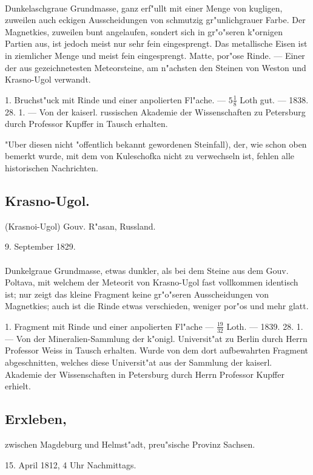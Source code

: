 \documentclass[a4paper, 11pt, oneside, polutonikogreek, german]{article}
\begin{document}
\paragraph{}
Dunkelaschgraue Grundmasse, ganz erf"ullt mit einer Menge von kugligen, zuweilen auch eckigen Ausscheidungen von schmutzig gr"unlichgrauer Farbe. Der Magnetkies, zuweilen bunt angelaufen, sondert sich in gr"o"seren k"ornigen Partien aus, ist jedoch meist nur sehr fein eingesprengt. Das metallische Eisen ist in ziemlicher Menge und meist fein eingesprengt. Matte, por"ose Rinde. --- Einer der aus gezeichnetesten Meteorsteine‚ am n"achsten den Steinen von Weston und Krasno-Ugol verwandt.

1. Bruchst"uck mit Rinde und einer anpolierten Fl"ache. --- $5\frac{1}{8}$ Loth gut. --- 1838. 28. 1. --- Von der kaiserl. russischen Akademie der Wissenschaften zu Petersburg durch Professor Kupffer in Tausch erhalten.

"Uber diesen nicht "offentlich bekannt gewordenen Steinfall), der, wie schon oben bemerkt wurde, mit dem von Kuleschofka nicht zu verwechseln ist, fehlen alle historischen Nachrichten.
\subsection{Krasno-Ugol.}
\begin{center}
\small
(Krasnoi-Ugol) Gouv. R"asan, Russland.

9. September 1829.
\end{center}
\paragraph{}
Dunkelgraue Grundmasse, etwas dunkler, als bei dem Steine aus dem Gouv. Poltava, mit welchem der Meteorit von Krasno-Ugol fast vollkommen identisch ist; nur zeigt das kleine Fragment keine gr"o"seren Ausscheidungen von Magnetkies; auch ist die Rinde etwas verschieden, weniger por"os und mehr glatt.

1. Fragment mit Rinde und einer anpolierten Fl"ache --- $\frac{19}{32}$ Loth. --- 1839. 28. 1. --- Von der Mineralien-Sammlung der k"onigl. Universit"at zu Berlin durch Herrn Professor Weiss in Tausch erhalten. Wurde von dem dort aufbewahrten Fragment abgeschnitten, welches diese Universit"at aus der Sammlung der kaiserl. Akademie der Wissenschaften in Petersburg durch Herrn Professor Kupffer erhielt.
\subsection[Erxleben.]{Erxleben,}
\begin{center}
\small
zwischen Magdeburg und Helmst"adt, preu"sische Provinz Sachsen.

15. April 1812, 4 Uhr Nachmittags.
\end{center}
\end{document}
